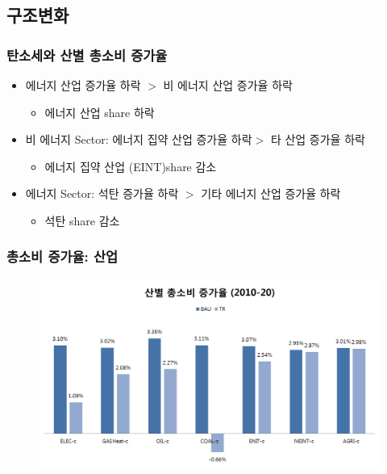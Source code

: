 \documentclass[10pt,compress,slidetop,%
			   hyperref={unicode},xcolor={svgnames},%
			   t]{beamer}
\begin{document}
\subsection{구조변화}
\begin{frame}
	\frametitle{탄소세와 산별 총소비 증가율}
	\begin{itemize}
		\item{에너지 산업 증가율 하락 $>$ 비 에너지 산업 증가율 하락}
		\begin{itemize}
			\item{에너지 산업 share 하락}
		\end{itemize} 
		\bigskip
		\item{비 에너지 Sector: 에너지 집약 산업 증가율 하락$>$ 타 산업 증가율 하락 }
		\begin{itemize}
			\item{에너지 집약 산업 (EINT)share 감소}
		\end{itemize} 	
		\bigskip		
		\item{에너지 Sector: 석탄 증가율 하락 $>$ 기타 에너지 산업 증가율 하락 }
		\begin{itemize}
			\item{석탄 share 감소}
		\end{itemize} 	
	\end{itemize}
\end{frame}

\begin{frame}
	\frametitle{총소비 증가율: 산업}
	\begin{figure}
		\centering
		\includegraphics[width=1.00\textwidth]{output_secter.png}
	\end{figure}
\end{frame}
\end{document}
